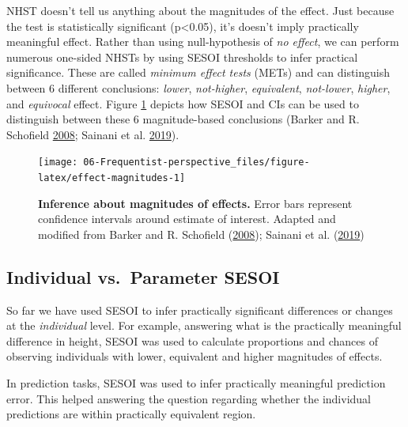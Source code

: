 \documentclass[
]{book}
\begin{document}
NHST doesn't tell us anything about the magnitudes of the effect. Just because the test is statistically significant (p\textless0.05), it's doesn't imply practically meaningful effect. Rather than using null-hypothesis of \emph{no effect}, we can perform numerous one-sided NHSTs by using SESOI thresholds to infer practical significance. These are called \emph{minimum effect tests} (METs) and can distinguish between 6 different conclusions: \emph{lower}, \emph{not-higher}, \emph{equivalent}, \emph{not-lower}, \emph{higher}, and \emph{equivocal} effect. Figure \ref{fig:effect-magnitudes} depicts how SESOI and CIs can be used to distinguish between these 6 magnitude-based conclusions (Barker and R. Schofield \protect\hyperlink{ref-barkerInferenceMagnitudesEffects2008}{2008}; Sainani et al. \protect\hyperlink{ref-sainaniMagnitudeBasedInference2019}{2019}).

\begin{figure}

{\centering \texttt{[image: 06-Frequentist-perspective\_files/figure-latex/effect-magnitudes-1]} 

}

\caption{\textbf{Inference about magnitudes of effects.} Error bars represent confidence intervals around estimate of interest. Adapted and modified from Barker and R. Schofield (\protect\hyperlink{ref-barkerInferenceMagnitudesEffects2008}{2008}); Sainani et al. (\protect\hyperlink{ref-sainaniMagnitudeBasedInference2019}{2019})}\label{fig:effect-magnitudes}
\end{figure}



\hypertarget{individual-vs.-parameter-sesoi}{%
\subsection{Individual vs.~Parameter SESOI}\label{individual-vs.-parameter-sesoi}}

So far we have used SESOI to infer practically significant differences or changes at the \emph{individual} level. For example, answering what is the practically meaningful difference in height, SESOI was used to calculate proportions and chances of observing individuals with lower, equivalent and higher magnitudes of effects.

In prediction tasks, SESOI was used to infer practically meaningful prediction error. This helped answering the question regarding whether the individual predictions are within practically equivalent region.
\end{document}
